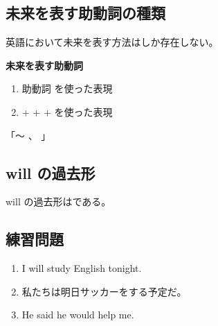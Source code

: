 \subsection{未来を表す助動詞の種類}
    英語において未来を表す方法はしか存在しない。

    \begin{definitionbox}{\textbf{未来を表す助動詞}}
        \begin{enumerate}
            \item 助動詞  を使った表現
            \item {} +  +  + を使った表現
        \end{enumerate}

        \begin{flushright}
            「〜  、  」
        \end{flushright}
    \end{definitionbox}
    \vspace{0.5em}

\subsection{will の過去形}
    will の過去形はである。
\vspace{2em}

\subsection{練習問題}

    \begin{enumerate}
        \item I will study English tonight.
        \vspace{0.5em}
        \item 私たちは明日サッカーをする予定だ。
        \vspace{0.5em}
        \item He said he would help me.
    \end{enumerate}

\newpage

